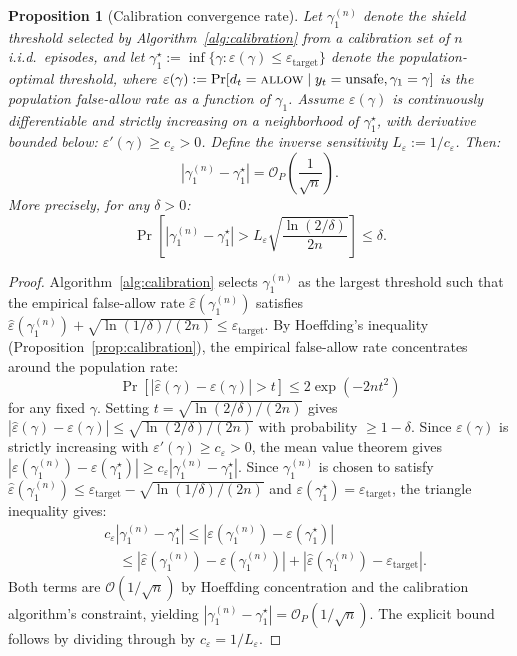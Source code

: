 \documentclass[10pt,journal,compsoc]{IEEEtran}
\newtheorem{proposition}{Proposition}
\begin{document}
\begin{proposition}[Calibration convergence rate]
\label{prop:convergence}
Let $\gamma_1^{(n)}$ denote the shield threshold selected by Algorithm~\ref{alg:calibration} from a calibration set of $n$ i.i.d.\ episodes, and let $\gamma_1^\star := \inf\{\gamma : \varepsilon(\gamma) \le \varepsilon_{\mathrm{target}}\}$ denote the population-optimal threshold, where $\varepsilon(\gamma) := \Pr[d_t = \textsc{allow} \mid y_t = \text{unsafe}, \gamma_1 = \gamma]$ is the population false-allow rate as a function of $\gamma_1$.
Assume $\varepsilon(\gamma)$ is continuously differentiable and strictly increasing on a neighborhood of $\gamma_1^\star$, with derivative bounded below: $\varepsilon'(\gamma) \ge c_\varepsilon > 0$.
Define the inverse sensitivity $L_\varepsilon := 1/c_\varepsilon$.
Then:
\[
|\gamma_1^{(n)} - \gamma_1^\star| = \mathcal{O}_P\!\left(\frac{1}{\sqrt{n}}\right).
\]
More precisely, for any $\delta > 0$:
\[
\Pr\!\left[|\gamma_1^{(n)} - \gamma_1^\star| > L_\varepsilon\sqrt{\frac{\ln(2/\delta)}{2n}}\right] \le \delta.
\]
\end{proposition}
\begin{proof}
Algorithm~\ref{alg:calibration} selects $\gamma_1^{(n)}$ as the largest threshold such that the empirical false-allow rate $\hat{\varepsilon}(\gamma_1^{(n)})$ satisfies $\hat{\varepsilon}(\gamma_1^{(n)}) + \sqrt{\ln(1/\delta)/(2n)} \le \varepsilon_{\mathrm{target}}$.
By Hoeffding's inequality (Proposition~\ref{prop:calibration}), the empirical false-allow rate concentrates around the population rate:
\[
\Pr\!\left[|\hat{\varepsilon}(\gamma) - \varepsilon(\gamma)| > t\right] \le 2\exp(-2nt^2)
\]
for any fixed $\gamma$.
Setting $t = \sqrt{\ln(2/\delta)/(2n)}$ gives $|\hat{\varepsilon}(\gamma) - \varepsilon(\gamma)| \le \sqrt{\ln(2/\delta)/(2n)}$ with probability $\ge 1-\delta$.
Since $\varepsilon(\gamma)$ is strictly increasing with $\varepsilon'(\gamma) \ge c_\varepsilon > 0$, the mean value theorem gives $|\varepsilon(\gamma_1^{(n)}) - \varepsilon(\gamma_1^\star)| \ge c_\varepsilon |\gamma_1^{(n)} - \gamma_1^\star|$.
Since $\gamma_1^{(n)}$ is chosen to satisfy $\hat{\varepsilon}(\gamma_1^{(n)}) \le \varepsilon_{\mathrm{target}} - \sqrt{\ln(1/\delta)/(2n)}$ and $\varepsilon(\gamma_1^\star) = \varepsilon_{\mathrm{target}}$, the triangle inequality gives:
\begin{align*}
&c_\varepsilon |\gamma_1^{(n)} - \gamma_1^\star| \le |\varepsilon(\gamma_1^{(n)}) - \varepsilon(\gamma_1^\star)|\\
&\quad\le |\hat{\varepsilon}(\gamma_1^{(n)}) \!-\! \varepsilon(\gamma_1^{(n)})| + |\hat{\varepsilon}(\gamma_1^{(n)}) \!-\! \varepsilon_{\mathrm{target}}|.
\end{align*}
Both terms are $\mathcal{O}(1/\sqrt{n})$ by Hoeffding concentration and the calibration algorithm's constraint, yielding $|\gamma_1^{(n)} - \gamma_1^\star| = \mathcal{O}_P(1/\sqrt{n})$.
The explicit bound follows by dividing through by $c_\varepsilon = 1/L_\varepsilon$.
\end{proof}
\end{document}
